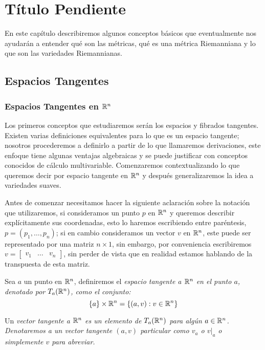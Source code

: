 \chapter{Título Pendiente}\label{Capítulo: Conceptos Básicos}

En este capítulo describiremos algunos conceptos básicos que eventualmente nos ayudarán a entender qué son las métricas, qué es una métrica Riemanniana y lo que son las variedades Riemannianas.

\section{Espacios Tangentes}\label{Sección: Espacios Tangentes}
\subsection{Espacios Tangentes en $\mathbb{R}^n$}\label{Subsección: Espacios Tangentes en Rn}

Los primeros conceptos que estudiaremos serán los espacios y fibrados tangentes. Existen varias definiciones equivalentes para lo que es un espacio tangente; nosotros procederemos a definirlo a partir de lo que llamaremos derivaciones, este enfoque tiene algunas ventajas algebraicas y se puede justificar con conceptos conocidos de cálculo multivariable. Comenzaremos contextualizando lo que queremos decir por espacio tangente en $\mathbb{R}^n$ y después generalizaremos la idea a variedades suaves.

Antes de comenzar necesitamos hacer la siguiente aclaración sobre la notación que utilizaremos, si consideramos un punto $p$ en $\mathbb{R}^n$ y queremos describir explícitamente sus coordenadas, esto lo haremos escribiendo entre paréntesis, $p = (p_1, \hdots, p_n)$; si en cambio consideramos un vector $v$ en $\mathbb{R}^n$, este puede ser representado por una matriz $n \times 1$, sin embargo, por conveniencia escribiremos $v = \begin{bmatrix} v_1 & \dots & v_n \end{bmatrix}$, sin perder de vista que en realidad estamos hablando de la transpuesta de esta matriz.

\begin{definition}\label{Definición: Espacio Tangente en Rn}
	Sea $a$ un punto en $\mathbb{R}^n$, definiremos el \it{espacio tangente a $\mathbb{R}^n$ en el punto $a$}, denotado por $T_a(\mathbb{R}^n)$, como el conjunto:
	\[ \{a\} \times \mathbb{R}^n = \{(a,v): v \in \mathbb{R}^n\} \]

	Un \it{vector tangente} a $\mathbb{R}^n$ es un elemento de $T_a(\mathbb{R}^n)$ para algún $a \in \mathbb{R}^n$. Denotaremos a un vector tangente $(a,v)$ particular como $v_a$ o $v|_a$ o simplemente $v$ para abreviar.
\end{definition}

